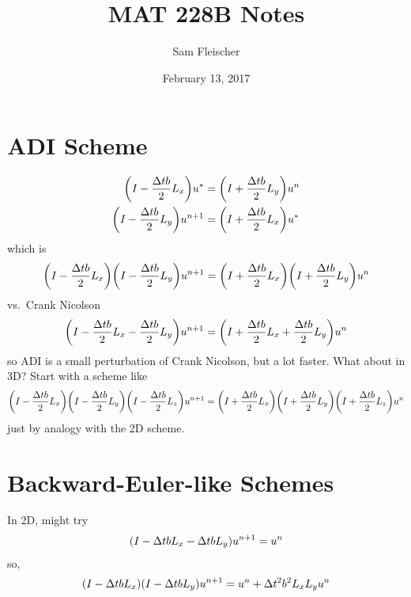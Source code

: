 \documentclass{article}
\title{MAT 228B Notes}
\author{Sam Fleischer}
\date{February 13, 2017}
\newcommand{\Dt}{\Delta t}
\begin{document}
    \maketitle

    \section{ADI Scheme}
        \begin{align*}
            \qty(I - \frac{\Dt b}{2}L_x)u^* &= \qty(I + \frac{\Dt b}{2}L_y)u^n \\
            \qty(I - \frac{\Dt b}{2}L_y)u^{n+1} &= \qty(I + \frac{\Dt b}{2}L_x)u^*
        \end{align*}
        which is
        \begin{align*}
            \qty(I - \frac{\Dt b}{2}L_x)\qty(I - \frac{\Dt b}{2}L_y)u^{n+1} = \qty(I + \frac{\Dt b}{2}L_x)\qty(I + \frac{\Dt b}{2}L_y)u^n
        \end{align*}
        vs.~Crank Nicolson
        \begin{align*}
            \qty(I - \frac{\Dt b}{2}L_x - \frac{\Dt b}{2}L_y)u^{n+1} = \qty(I + \frac{\Dt b}{2}L_x + \frac{\Dt b}{2}L_y)u^n
        \end{align*}
        so ADI is a small perturbation of Crank Nicolson, but a lot faster.  What about in 3D?  Start with a scheme like
        \begin{align*}
            \qty(I - \frac{\Dt b}{2}L_x)\qty(I - \frac{\Dt b}{2}L_y)\qty(I - \frac{\Dt b}{2}L_z)u^{n+1} = \qty(I + \frac{\Dt b}{2}L_x)\qty(I + \frac{\Dt b}{2}L_y)\qty(I + \frac{\Dt b}{2}L_z)u^n
        \end{align*}
        just by analogy with the 2D scheme.

    \section{Backward-Euler-like Schemes}
        In 2D, might try
        \begin{align*}
            \qty(I - \Dt bL_x - \Dt b L_y)u^{n+1} = u^n
        \end{align*}
        so,
        \begin{align*}
            \qty(I - \Dt b L_x)\qty(I - \Dt b L_y)u^{n+1} = u^n + \Dt^2 b^2 L_xL_y u^n
        \end{align*}
\end{document}
